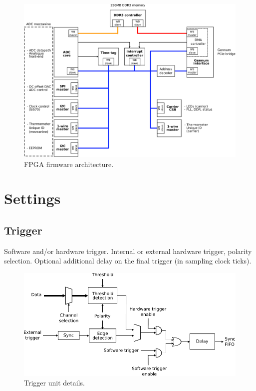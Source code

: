 \documentclass[11pt,a4paper]{article}
\begin{document}
\begin{figure}[h!]
  \includegraphics[width=\textwidth]{figures/firmware_arch.pdf}
  \caption{FPGA firmware architecture.}
  \label{fig:firmware_arch}
\end{figure}

\section{Settings}


\subsection{Trigger}
Software and/or hardware trigger. Internal or external hardware trigger, polarity selection.
Optional additional delay on the final trigger (in sampling clock ticks).

\begin{figure}[h!]
  \includegraphics[width=\textwidth]{figures/trigger_unit.pdf}
  \caption{Trigger unit details.}
  \label{fig:trigger_unit}
\end{figure}
\end{document}
